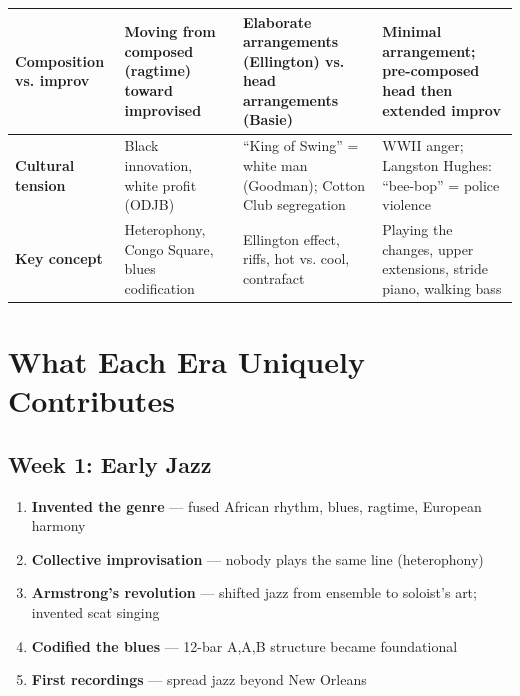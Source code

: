\documentclass[11pt,letterpaper]{article}
\begin{document}
\begin{small}
\begin{longtable}{>{\bfseries}p{2.6cm} p{3.8cm} p{3.8cm} p{3.8cm}}
\midrule
Composition vs. improv & Moving from composed (ragtime) toward improvised & Elaborate arrangements (Ellington) vs. head arrangements (Basie) & Minimal arrangement; pre-composed head then extended improv \\
\midrule
Cultural tension & Black innovation, white profit (ODJB) & ``King of Swing'' = white man (Goodman); Cotton Club segregation & WWII anger; Langston Hughes: ``bee-bop'' = police violence \\
\midrule
Key concept & Heterophony, Congo Square, blues codification & Ellington effect, riffs, hot vs. cool, contrafact & Playing the changes, upper extensions, stride piano, walking bass \\
\bottomrule
\end{longtable}
\end{small}

\section{What Each Era Uniquely Contributes}

\subsection{\textcolor{week1color}{Week 1: Early Jazz}}
\begin{enumerate}[leftmargin=1.5em]
  \item \textbf{Invented the genre} --- fused African rhythm, blues, ragtime, European harmony
  \item \textbf{Collective improvisation} --- nobody plays the same line (heterophony)
  \item \textbf{Armstrong's revolution} --- shifted jazz from ensemble to soloist's art; invented scat singing
  \item \textbf{Codified the blues} --- 12-bar A,A,B structure became foundational
  \item \textbf{First recordings} --- spread jazz beyond New Orleans
\end{enumerate}
\end{document}
